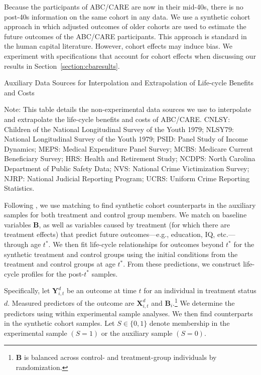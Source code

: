 Because the participants of ABC/CARE are now in their mid-40s, there is no post-40s information on the same cohort  in any data. We use a synthetic cohort approach in which adjusted outcomes of older cohorts are used to estimate the future outcomes of the ABC/CARE participants. This approach is standard in the human capital literature. However, cohort effects may induce bias. We experiment with specifications that account for cohort effects when discussing our results in Section~\ref{section:cbaresults}.

\begin{table}[!htbp]
\begin{threeparttable}
\caption{Auxiliary Data Sources for Interpolation and Extrapolation of Life-cycle Benefits and Costs} \label{table:sources}
\footnotesize

\begin{tablenotes}
\footnotesize
Note: This table details the non-experimental data sources we use to interpolate and extrapolate the life-cycle benefits and costs of ABC/CARE. CNLSY: Children of the National Longitudinal Survey of the Youth 1979; NLSY79: National Longitudinal Survey of the Youth 1979; PSID: Panel Study of Income Dynamics; MEPS: Medical Expenditure Panel Survey; MCBS: Medicare Current Beneficiary Survey; HRS: Health and Retirement Study; NCDPS: North Carolina Department of Public Safety Data; NVS: National Crime Victimization Survey; NJRP: National Judicial Reporting Program; UCRS: Uniform Crime Reporting Statistics.
\end{tablenotes}
\end{threeparttable}
\end{table}

Following \citet{Heckman_Ichimura_etal_1998_REStud}, we use matching to find synthetic cohort counterparts in the auxiliary samples for both treatment and control group members. We match on baseline variables $\bm{B}$, as well as variables caused by treatment (for which there are treatment effects) that predict future outcomes---e.g., education, IQ, etc.---through age $t^{\ast}$. We then fit life-cycle relationships for outcomes beyond $t^{\ast}$ for the synthetic treatment and control groups using the initial conditions from the treatment and control groups at age $t^{\ast}$. From these predictions, we construct life-cycle profiles for the post-$t^*$ samples.

Specifically, let $\bm{Y}^{d}_{i,t}$ be an outcome at time $t$ for an individual in treatment status $d$. Measured predictors of the outcome are $\bm{X}^{d}_{i,t}$ and $\bm{B}_i$.\footnote{$\bm{B}$ is balanced across control- and treatment-group individuals by randomization.} We determine the predictors using within experimental sample analyses. We then find counterparts in the synthetic cohort samples. Let $S \in \{ 0,1\}$ denote membership in the experimental sample $(S=1)$ or the auxiliary sample $(S=0)$.

